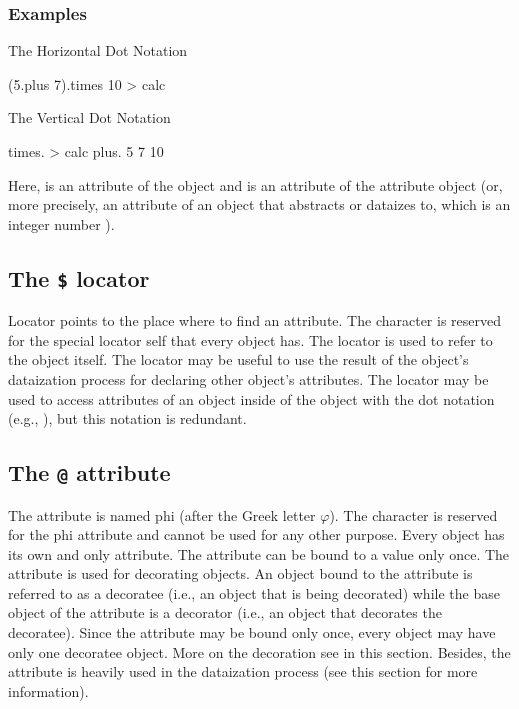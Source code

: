 \documentclass[12pt]{book}
\begin{document}
\subsubsection{Examples}

The Horizontal Dot Notation
\begin{ffcode}
(5.plus 7).times 10 > calc
\end{ffcode}
The Vertical Dot Notation
\begin{ffcode}
times. > calc
  plus.
    5
    7
  10
\end{ffcode}

Here,  is an attribute of the object  and  is an attribute of the attribute object  (or, more precisely, an attribute of an object that  abstracts or dataizes to, which is an integer number ).

\subsection{The \texttt{\$} locator}
Locator points to the place where to find an attribute. The \ff{$} character is reserved for the special locator self that every object has. The \ff{$} locator is used to refer to the object itself.
The \ff{$} locator may be useful to use the result of the object's dataization process for declaring other object's attributes.
The \ff{$} locator may be used to access attributes of an object inside of the object with the dot notation (e.g., ), but this notation is redundant.

\subsection{The \texttt{@} attribute} \label{subsec:@-attr}
The  attribute is named phi (after the Greek letter $\varphi$). The  character is reserved for the phi attribute and cannot be used for any other purpose. Every object has its own and only  attribute. The  attribute can be bound to a value only once.
The  attribute is used for decorating objects. An object bound to the  attribute is referred to as a decoratee (i.e., an object that is being decorated) while the base object of the  attribute is a decorator (i.e., an object that decorates the decoratee). Since the  attribute may be bound only once, every object may have only one decoratee object. More on the decoration see in this section.
Besides, the  attribute is heavily used in the dataization process (see this section for more information).
\end{document}
